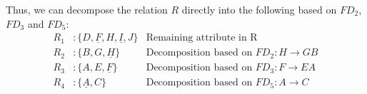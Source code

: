 \documentclass[11pt,letterpaper,titlepage,en-US]{article}
\begin{document}
\begin{homeworkProblem}
\begin{homeworkSubProblem}
        Thus, we can decompose the relation $R$ directly into the following based on $FD_2$, $FD_3$ and $FD_5$:
        \begin{align*}
            R_1& : \{D, \underline{F}, H, \underline{I}, J\} & \text{Remaining attribute in R}\\
            R_2& : \{B, G, \underline{H}\} & \text{Decomposition based on $FD_2: H \rightarrow GB$}\\
            R_3& : \{A, E, \underline{F}\} & \text{Decomposition based on $FD_3: F \rightarrow EA$}\\
            R_4& : \{\underline{A}, C\} & \text{Decomposition based on $FD_5: A \rightarrow C$}\\
        \end{align*}
    \end{homeworkSubProblem}
\end{homeworkProblem}
\pagebreak
\end{document}
